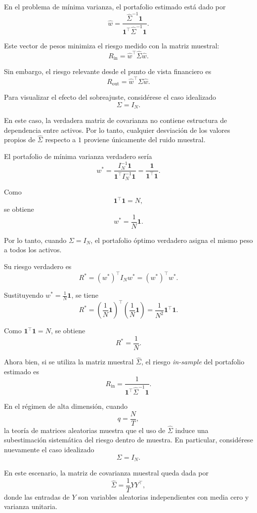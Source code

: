 \documentclass[letterpaper,12pt,oneside]{book}
\begin{document}
En el problema de mínima varianza, el portafolio estimado está dado por
\[
\widehat{w}
=
\frac{
\widehat{\Sigma}^{-1}\mathbf{1}
}{
\mathbf{1}^\top
\widehat{\Sigma}^{-1}
\mathbf{1}
}.
\]

Este vector de pesos minimiza el riesgo medido con la matriz muestral:
\[
R_{\mathrm{in}}
=
\widehat{w}^{\top}
\widehat{\Sigma}
\widehat{w}.
\]

Sin embargo, el riesgo relevante desde el punto de vista financiero es
\[
R_{\mathrm{out}}
=
\widehat{w}^{\top}
\Sigma
\widehat{w}.
\]

Para visualizar el efecto del sobreajuste, considérese el caso idealizado
\[
\Sigma=I_N.
\]

En este caso, la verdadera matriz de covarianza no contiene estructura de dependencia entre activos. Por lo tanto, cualquier desviación de los valores propios de \(\widehat{\Sigma}\) respecto a \(1\) proviene únicamente del ruido muestral.

El portafolio de mínima varianza verdadero sería
\[
w^*
=
\frac{
I_N^{-1}\mathbf{1}
}{
\mathbf{1}^\top I_N^{-1}\mathbf{1}
}
=
\frac{
\mathbf{1}
}{
\mathbf{1}^\top \mathbf{1}
}.
\]

Como
\[
\mathbf{1}^\top \mathbf{1}=N,
\]
se obtiene
\[
w^*
=
\frac{1}{N}\mathbf{1}.
\]

Por lo tanto, cuando \(\Sigma=I_N\), el portafolio óptimo verdadero asigna el mismo peso a todos los activos.

Su riesgo verdadero es
\[
R^*
=
(w^*)^\top I_N w^*
=
(w^*)^\top w^*.
\]

Sustituyendo \(w^*=\frac{1}{N}\mathbf{1}\), se tiene
\[
R^*
=
\left(
\frac{1}{N}\mathbf{1}
\right)^\top
\left(
\frac{1}{N}\mathbf{1}
\right)
=
\frac{1}{N^2}\mathbf{1}^\top\mathbf{1}.
\]

Como \(\mathbf{1}^\top\mathbf{1}=N\), se obtiene
\[
R^*
=
\frac{1}{N}.
\]

Ahora bien, si se utiliza la matriz muestral \(\widehat{\Sigma}\), el riesgo \textit{in-sample} del portafolio estimado es
\[
R_{\mathrm{in}}
=
\frac{
1
}{
\mathbf{1}^\top
\widehat{\Sigma}^{-1}
\mathbf{1}
}.
\]

En el régimen de alta dimensión, cuando
\[
q=\frac{N}{T},
\]
la teoría de matrices aleatorias muestra que el uso de \(\widehat{\Sigma}\) induce una subestimación sistemática del riesgo dentro de muestra. En particular, considérese nuevamente el caso idealizado
\[
\Sigma=I_N.
\]

En este escenario, la matriz de covarianza muestral queda dada por
\[
\widehat{\Sigma}
=
\frac{1}{T}YY^\top,
\]
donde las entradas de \(Y\) son variables aleatorias independientes con media cero y varianza unitaria.
\end{document}
